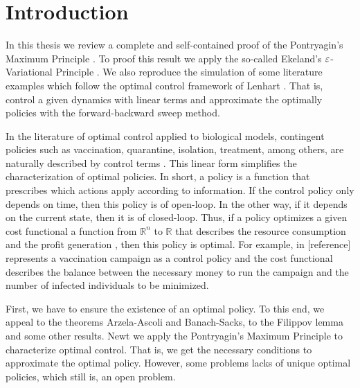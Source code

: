 \chapter{Introduction}

\label{Introduction} 
    
    In this thesis we review a complete and self-contained proof of the 
    Pontryagin's Maximum Principle \citep{YongDG_ACIntro}. To proof this result
    we apply the so-called Ekeland's $\varepsilon$-Variational Principle
    \citep{guler2010foundations}. We also reproduce the simulation of some 
    literature examples which follow the optimal control framework of Lenhart
    \citep{lenhart2007optimal}. That is, control a given dynamics with linear 
    terms and approximate the optimally policies with the 
    forward-backward sweep method. 

    In the literature of optimal control applied to biological models, contingent 
    policies such as vaccination, quarantine, isolation, treatment, among others,
    are naturally described by control terms \citep{SARS,lenhart2007optimal, PanettaFister, butler1997optimal, BearSalinasLenhart,articleLenhart}. This linear form 
    simplifies the characterization of optimal policies. In short, a policy is a 
    function that prescribes which actions apply according to information. If the 
    control policy only depends on time, then this policy is of open-loop. In the 
    other way, if it depends on the current state, then it is of closed-loop.  
    Thus, if a policy optimizes a given cost functional \textemdash a function 
    from $\mathbb{R}^n$ to $\mathbb{R}$ that describes the resource consumption 
    and the profit generation \textemdash, then this policy is optimal. For 
    example, in [reference] represents a vaccination campaign as a control policy 
    and the cost functional describes the balance between the necessary money to 
    run the campaign and the number of infected individuals to be minimized.

    First, we have to ensure the existence of an optimal policy. To this end, 
    we appeal to the theorems Arzela-Ascoli and Banach-Sacks, to the Filippov
    lemma and some other results. Newt we apply the Pontryagin's Maximum 
    Principle to characterize optimal control. That is, we get the necessary 
    conditions to approximate the optimal policy. However, some problems 
    lacks of unique optimal policies, which still is, an open problem.

